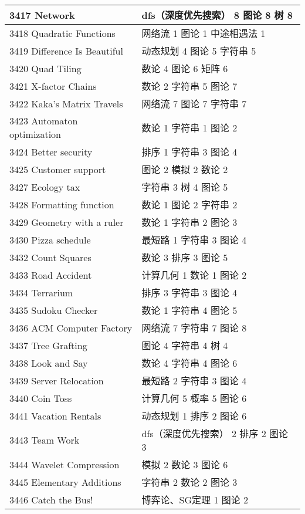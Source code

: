 \begin{longtable}{| p{} | p{} |}
 3417 Network  & dfs（深度优先搜索） 8 图论 8 树 8 \\ \hline
 3418 Quadratic Functions  & 网络流 1 图论 1 中途相遇法 1 \\ \hline
 3419 Difference Is Beautiful  & 动态规划 4 图论 5 字符串 5 \\ \hline
 3420 Quad Tiling  & 数论 4 图论 6 矩阵 6 \\ \hline
 3421 X-factor Chains  & 数论 2 字符串 5 图论 7 \\ \hline
 3422 Kaka's Matrix Travels  & 网络流 7 图论 7 字符串 7 \\ \hline
 3423 Automaton optimization  & 数论 1 字符串 1 图论 2 \\ \hline
 3424 Better security  & 排序 1 字符串 3 图论 4 \\ \hline
 3425 Customer support  & 图论 2 模拟 2 数论 2 \\ \hline
 3427 Ecology tax  & 字符串 3 树 4 图论 5 \\ \hline
 3428 Formatting function  & 数论 1 图论 2 字符串 2 \\ \hline
 3429 Geometry with a ruler  & 数论 1 字符串 2 图论 3 \\ \hline
 3430 Pizza schedule  & 最短路 1 字符串 3 图论 4 \\ \hline
 3432 Count Squares  & 数论 3 排序 3 图论 5 \\ \hline
 3433 Road Accident  & 计算几何 1 数论 1 图论 2 \\ \hline
 3434 Terrarium  & 排序 3 字符串 3 图论 4 \\ \hline
 3435 Sudoku Checker  & 数论 1 字符串 4 图论 5 \\ \hline
 3436 ACM Computer Factory  & 网络流 7 字符串 7 图论 8 \\ \hline
 3437 Tree Grafting  & 图论 4 字符串 4 树 4 \\ \hline
 3438 Look and Say  & 数论 4 字符串 4 图论 6 \\ \hline
 3439 Server Relocation  & 最短路 2 字符串 3 图论 4 \\ \hline
 3440 Coin Toss  & 计算几何 5 概率 5 图论 6 \\ \hline
 3441 Vacation Rentals  & 动态规划 1 排序 2 图论 6 \\ \hline
 3443 Team Work  & dfs（深度优先搜索） 2 排序 2 图论 3 \\ \hline
 3444 Wavelet Compression  & 模拟 2 数论 3 图论 6 \\ \hline
 3445 Elementary Additions  & 字符串 2 数论 2 图论 3 \\ \hline
 3446 Catch the Bus!  & 博弈论、SG定理 1 图论 2 \\ \hline

\end{longtable}
